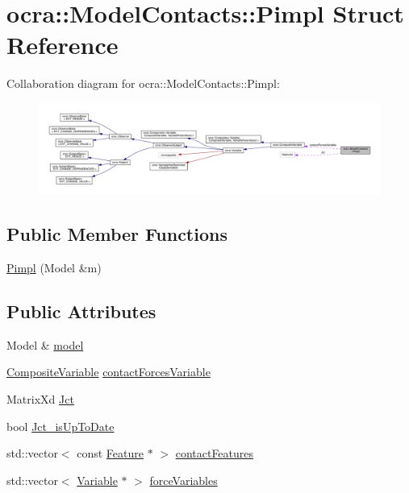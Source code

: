 \hypertarget{structocra_1_1ModelContacts_1_1Pimpl}{}\section{ocra\+:\+:Model\+Contacts\+:\+:Pimpl Struct Reference}
\label{structocra_1_1ModelContacts_1_1Pimpl}


Collaboration diagram for ocra\+:\+:Model\+Contacts\+:\+:Pimpl\+:\nopagebreak
\begin{figure}[H]
\begin{center}
\leavevmode
\includegraphics[width=350pt]{d9/d86/structocra_1_1ModelContacts_1_1Pimpl__coll__graph}
\end{center}
\end{figure}
\subsection*{Public Member Functions}
\begin{DoxyCompactItemize}
\item 
\hyperlink{structocra_1_1ModelContacts_1_1Pimpl_a49e42d553f4cb66b8c6207e63733d410}{Pimpl} (Model \&m)
\end{DoxyCompactItemize}
\subsection*{Public Attributes}
\begin{DoxyCompactItemize}
\item 
Model \& \hyperlink{structocra_1_1ModelContacts_1_1Pimpl_a16998d1fe02ccbb3a3f2282d5ddc5074}{model}
\item 
\hyperlink{classocra_1_1CompositeVariable}{Composite\+Variable} \hyperlink{structocra_1_1ModelContacts_1_1Pimpl_a274e86267cd0b9dba8105fda27fda205}{contact\+Forces\+Variable}
\item 
Matrix\+Xd \hyperlink{structocra_1_1ModelContacts_1_1Pimpl_ae11aa9cbd6a04aebd3039556c3da027b}{Jct}
\item 
bool \hyperlink{structocra_1_1ModelContacts_1_1Pimpl_ac0fa66cfb8b54718dd3a03c683819c6d}{Jct\+\_\+is\+Up\+To\+Date}
\item 
std\+::vector$<$ const \hyperlink{classocra_1_1Feature}{Feature} $\ast$ $>$ \hyperlink{structocra_1_1ModelContacts_1_1Pimpl_ac15c6469b805fa54ffb5422a7b1014bd}{contact\+Features}
\item 
std\+::vector$<$ \hyperlink{classocra_1_1Variable}{Variable} $\ast$ $>$ \hyperlink{structocra_1_1ModelContacts_1_1Pimpl_a133837a5c20241ac20b41c0fb7401682}{force\+Variables}
\end{DoxyCompactItemize}


